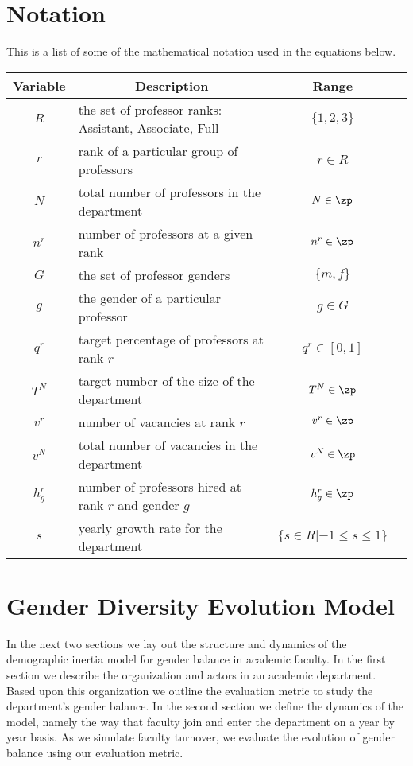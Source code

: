 \documentclass[12pt, a4paper, oneside, headinclude, footinclude,english]{article}
\begin{document}
\section{Notation}
\label{sec:notation}

This is a list of some of the mathematical notation used in the equations below. 

\begin{table}[H]
\centering
\begin{tabular}{|c|l|c|l|}
\hline
 \multicolumn{1}{|c|}{\textbf{Variable}} & \multicolumn{1}{|c|}{\textbf{Description}} & \multicolumn{1}{|c|}{\textbf{Range}} \\ \hline
 $R$ & the set of professor ranks: Assistant, Associate, Full & $\{1,2,3\}$ \\ \hline
 $r$ & rank of a particular group of professors & $r \in R$   \\ \hline
 $N$ & total number of professors in the department & $N \in \zp$   \\ \hline
  $n^r$ & number of professors at a given rank & $n^r \in \zp$   \\ \hline
  $G$ & the set of professor genders & $\{m, f\}$ \\ \hline
  $g$ & the gender of a particular professor & $g \in G$ \\ \hline
  $q^r$ & target percentage of professors at rank $r$ & $q^r \in [0,1]$  \\ \hline
  $T^N$ & target number of the size of the department & $T^N \in \zp$  \\ \hline
 $v^{r}$ & number of vacancies at rank $r$ & $v^r \in \zp$  \\ \hline
 $v^N$ & total number of vacancies in the department & $v^N \in \zp$  \\ \hline
 $h^{r}_{g}$ & number of professors hired at rank $r$ and gender $g$ & $h^{r}_{g} \in \zp$ \\ \hline
 $s$ & yearly growth rate for the department & $\{s \in R | -1 \leq s \leq 1\}$ \\ \hline
\end{tabular}
\end{table}


\section{Gender Diversity Evolution Model}
\label{sec:genduniv-model}

In the next two sections we lay out the structure and dynamics of the
demographic inertia model for gender balance in academic faculty. In the first
section we describe the organization and actors in an academic department. Based
upon this organization we outline the evaluation metric to study the
department's gender balance. In the second section we define the dynamics of the
model, namely the way that faculty join and enter the department on a year by
year basis. As we simulate faculty turnover, we evaluate the evolution of gender
balance using our evaluation metric. 
\end{document}

